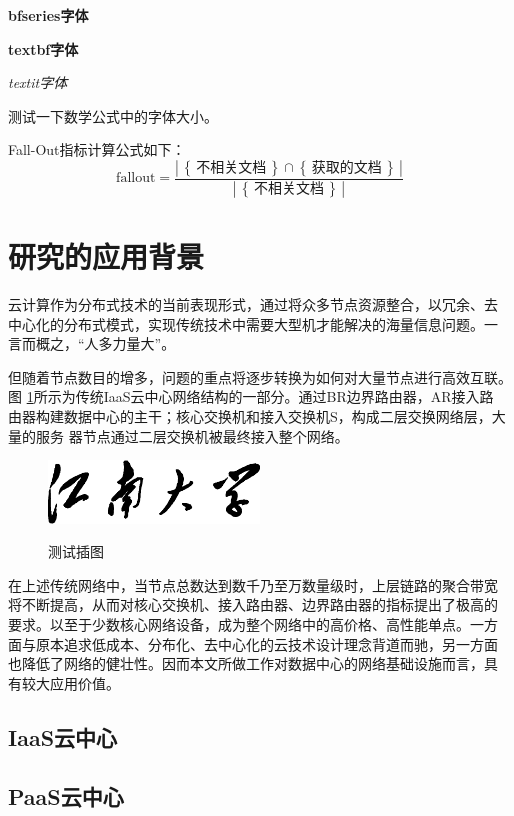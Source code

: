 \documentclass[phd]{jnuthesis}
\begin{document}
{\bfseries bfseries字体}

{\textbf{textbf字体}}

{\textit{textit字体}}

测试一下数学公式中的字体大小。

\newcommand{\set}[1]{\left\{\,#1\,\right\}}
\newcommand{\card}[1]{\left|\,#1\,\right|}

Fall-Out指标计算公式如下：
\begin{equation*}
  \mbox{fallout} = \frac{\card{\set{\text{不相关文档}}\cap\set{\text{获取的文档}}}}{\card{\set{\text{不相关文档}}}}
\end{equation*}

\section{研究的应用背景}
云计算作为分布式技术的当前表现形式，通过将众多节点资源整合，以冗余、去
中心化的分布式模式，实现传统技术中需要大型机才能解决的海量信息问题。一
言而概之，“人多力量大”。

但随着节点数目的增多，问题的重点将逐步转换为如何对大量节点进行高效互联。图
\ref{fig:test1}所示为传统IaaS云中心网络结构的一部分。通过BR边界路由器，AR接入路
由器构建数据中心的主干；核心交换机和接入交换机S，构成二层交换网络层，大量的服务
器节点通过二层交换机被最终接入整个网络。
\begin{figure}[htbp]
  \centering
  \includegraphics[width= 0.5\textwidth]{jnuname.eps}\\
  \caption{测试插图}\label{fig:test1}
\end{figure}
在上述传统网络中，当节点总数达到数千乃至万数量级时，上层链路的聚合带宽
将不断提高，从而对核心交换机、接入路由器、边界路由器的指标提出了极高的
要求。以至于少数核心网络设备，成为整个网络中的高价格、高性能单点。一方
面与原本追求低成本、分布化、去中心化的云技术设计理念背道而驰，另一方面
也降低了网络的健壮性。因而本文所做工作对数据中心的网络基础设施而言，具
有较大应用价值。
\subsection{IaaS云中心}
\Blindtext
\subsection{PaaS云中心}
\Blindtext
\end{document}
